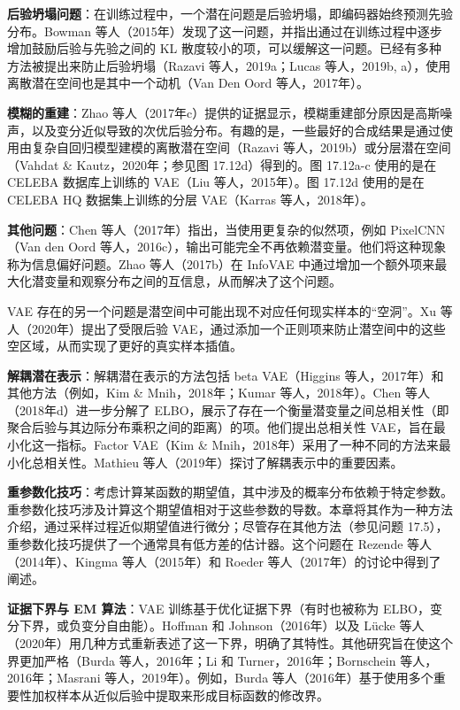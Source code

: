 \textbf{后验坍塌问题}：在训练过程中，一个潜在问题是后验坍塌，即编码器始终预测先验分布。Bowman 等人（2015年）发现了这一问题，并指出通过在训练过程中逐步增加鼓励后验与先验之间的 KL 散度较小的项，可以缓解这一问题。已经有多种方法被提出来防止后验坍塌（Razavi 等人，2019a；Lucas 等人，2019b, a），使用离散潜在空间也是其中一个动机（Van Den Oord 等人，2017年）。

\textbf{模糊的重建}：Zhao 等人（2017年c）提供的证据显示，模糊重建部分原因是高斯噪声，以及变分近似导致的次优后验分布。有趣的是，一些最好的合成结果是通过使用由复杂自回归模型建模的离散潜在空间（Razavi 等人，2019b）或分层潜在空间（Vahdat \& Kautz，2020年；参见图 17.12d）得到的。图 17.12a-c 使用的是在 CELEBA 数据库上训练的 VAE（Liu 等人，2015年）。图 17.12d 使用的是在 CELEBA HQ 数据集上训练的分层 VAE（Karras 等人，2018年）。

\textbf{其他问题}：Chen 等人（2017年）指出，当使用更复杂的似然项，例如 PixelCNN（Van den Oord 等人，2016c），输出可能完全不再依赖潜变量。他们将这种现象称为信息偏好问题。Zhao 等人（2017b）在 InfoVAE 中通过增加一个额外项来最大化潜变量和观察分布之间的互信息，从而解决了这个问题。

VAE 存在的另一个问题是潜空间中可能出现不对应任何现实样本的“空洞”。Xu 等人（2020年）提出了受限后验 VAE，通过添加一个正则项来防止潜空间中的这些空区域，从而实现了更好的真实样本插值。

\textbf{解耦潜在表示}：解耦潜在表示的方法包括 beta VAE（Higgins 等人，2017年）和其他方法（例如，Kim \& Mnih，2018年；Kumar 等人，2018年）。Chen 等人（2018年d）进一步分解了 ELBO，展示了存在一个衡量潜变量之间总相关性（即聚合后验与其边际分布乘积之间的距离）的项。他们提出总相关性 VAE，旨在最小化这一指标。Factor VAE（Kim \& Mnih，2018年）采用了一种不同的方法来最小化总相关性。Mathieu 等人（2019年）探讨了解耦表示中的重要因素。

\textbf{重参数化技巧}：考虑计算某函数的期望值，其中涉及的概率分布依赖于特定参数。重参数化技巧涉及计算这个期望值相对于这些参数的导数。本章将其作为一种方法介绍，通过采样过程近似期望值进行微分；尽管存在其他方法（参见问题 17.5），重参数化技巧提供了一个通常具有低方差的估计器。这个问题在 Rezende 等人（2014年）、Kingma 等人（2015年）和 Roeder 等人（2017年）的讨论中得到了阐述。

\textbf{证据下界与 EM 算法}：VAE 训练基于优化证据下界（有时也被称为 ELBO，变分下界，或负变分自由能）。Hoffman 和 Johnson（2016年）以及 Lücke 等人（2020年）用几种方式重新表述了这一下界，明确了其特性。其他研究旨在使这个界更加严格（Burda 等人，2016年；Li 和 Turner，2016年；Bornschein 等人，2016年；Masrani 等人，2019年）。例如，Burda 等人（2016年）基于使用多个重要性加权样本从近似后验中提取来形成目标函数的修改界。

